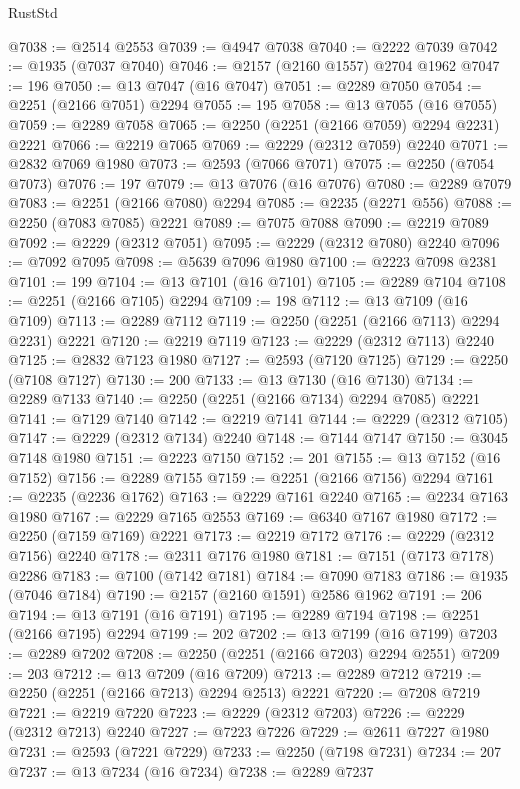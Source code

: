 \begin{lexlean}{RustStd}
\begin{coremodule}
{\begin{coremodule}
{{{{{{{{{{{{{{{{{{{{{{{{{{{{{{{{{{{{{{{{{{{{{{{{{{{{{@7038 := @2514 @2553
@7039 := @4947 @7038
@7040 := @2222 @7039
@7042 := @1935 (@7037 @7040)
@7046 := @2157 (@2160 @1557) @2704 @1962
@7047 := 196
@7050 := @13 @7047 (@16 @7047)
@7051 := @2289 @7050
@7054 := @2251 (@2166 @7051) @2294
@7055 := 195
@7058 := @13 @7055 (@16 @7055)
@7059 := @2289 @7058
@7065 := @2250 (@2251 (@2166 @7059) @2294 @2231) @2221
@7066 := @2219 @7065
@7069 := @2229 (@2312 @7059) @2240
@7071 := @2832 @7069 @1980
@7073 := @2593 (@7066 @7071)
@7075 := @2250 (@7054 @7073)
@7076 := 197
@7079 := @13 @7076 (@16 @7076)
@7080 := @2289 @7079
@7083 := @2251 (@2166 @7080) @2294
@7085 := @2235 (@2271 @556)
@7088 := @2250 (@7083 @7085) @2221
@7089 := @7075 @7088
@7090 := @2219 @7089
@7092 := @2229 (@2312 @7051)
@7095 := @2229 (@2312 @7080) @2240
@7096 := @7092 @7095
@7098 := @5639 @7096 @1980
@7100 := @2223 @7098 @2381
@7101 := 199
@7104 := @13 @7101 (@16 @7101)
@7105 := @2289 @7104
@7108 := @2251 (@2166 @7105) @2294
@7109 := 198
@7112 := @13 @7109 (@16 @7109)
@7113 := @2289 @7112
@7119 := @2250 (@2251 (@2166 @7113) @2294 @2231) @2221
@7120 := @2219 @7119
@7123 := @2229 (@2312 @7113) @2240
@7125 := @2832 @7123 @1980
@7127 := @2593 (@7120 @7125)
@7129 := @2250 (@7108 @7127)
@7130 := 200
@7133 := @13 @7130 (@16 @7130)
@7134 := @2289 @7133
@7140 := @2250 (@2251 (@2166 @7134) @2294 @7085) @2221
@7141 := @7129 @7140
@7142 := @2219 @7141
@7144 := @2229 (@2312 @7105)
@7147 := @2229 (@2312 @7134) @2240
@7148 := @7144 @7147
@7150 := @3045 @7148 @1980
@7151 := @2223 @7150
@7152 := 201
@7155 := @13 @7152 (@16 @7152)
@7156 := @2289 @7155
@7159 := @2251 (@2166 @7156) @2294
@7161 := @2235 (@2236 @1762)
@7163 := @2229 @7161 @2240
@7165 := @2234 @7163 @1980
@7167 := @2229 @7165 @2553
@7169 := @6340 @7167 @1980
@7172 := @2250 (@7159 @7169) @2221
@7173 := @2219 @7172
@7176 := @2229 (@2312 @7156) @2240
@7178 := @2311 @7176 @1980
@7181 := @7151 (@7173 @7178) @2286
@7183 := @7100 (@7142 @7181)
@7184 := @7090 @7183
@7186 := @1935 (@7046 @7184)
@7190 := @2157 (@2160 @1591) @2586 @1962
@7191 := 206
@7194 := @13 @7191 (@16 @7191)
@7195 := @2289 @7194
@7198 := @2251 (@2166 @7195) @2294
@7199 := 202
@7202 := @13 @7199 (@16 @7199)
@7203 := @2289 @7202
@7208 := @2250 (@2251 (@2166 @7203) @2294 @2551)
@7209 := 203
@7212 := @13 @7209 (@16 @7209)
@7213 := @2289 @7212
@7219 := @2250 (@2251 (@2166 @7213) @2294 @2513) @2221
@7220 := @7208 @7219
@7221 := @2219 @7220
@7223 := @2229 (@2312 @7203)
@7226 := @2229 (@2312 @7213) @2240
@7227 := @7223 @7226
@7229 := @2611 @7227 @1980
@7231 := @2593 (@7221 @7229)
@7233 := @2250 (@7198 @7231)
@7234 := 207
@7237 := @13 @7234 (@16 @7234)
@7238 := @2289 @7237
}}}}}}}}}}}}}}}}}}}}}}}}}}}}}}}}}}}}}}}}}}}}}}}}}}}}}
\end{coremodule}}
\end{coremodule}
\end{lexlean}
